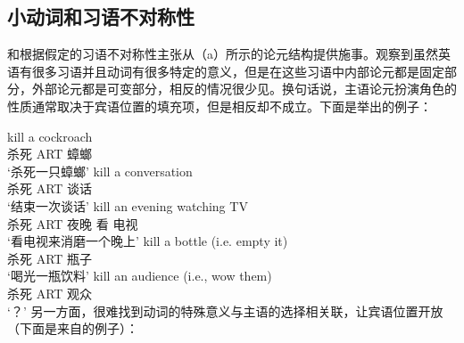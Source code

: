\subsection{小动词和习语不对称性}
\label{idiom-asym}

\mbox{}\citet{Marantz84a}和\citet{Kratzer96a}根据假定的习语不对称性主张从（a）所示的论元结构提供施事。\citet{Marantz84a}观察到虽然英语有很多习语并且动词有很多特定的意义，但是在这些习语中内部论元都是固定部分，外部论元都是可变部分，相反的情况很少见。换句话说，主语论元扮演角色的性质通常取决于宾语位置的填充项，但是相反却不成立。下面是\citep[]{Kratzer96a}举出的例子：

\eal
\ex 
\gll kill a cockroach\\
     杀死 ART 蟑螂\\
\glt `杀死一只蟑螂'
\ex 
\gll kill a conversation\\
    杀死 ART 谈话\\
\glt `结束一次谈话'
\ex 
\gll kill an evening watching TV\\
     杀死 ART 夜晚 看 电视\\
\glt `看电视来消磨一个晚上'
\ex 
\gll kill a bottle (i.e. empty it) \\
     杀死 ART 瓶子\\
\glt `喝光一瓶饮料'
\ex 
\gll kill an audience (i.e., wow them) \\
     杀死 ART 观众\\
\glt `？'
\zl
另一方面，很难找到动词的特殊意义与主语的选择相关联，让宾语位置开放（下面是来自的例子）：

